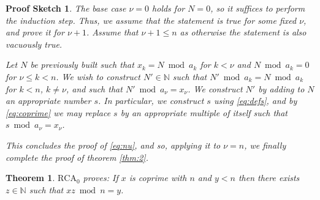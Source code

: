 \documentclass{article}
\newtheorem{theorem}{Theorem}
\theoremstyle{nonumberplain}
\newtheorem{sketch}{Proof Sketch}
\newcommand{\N}{\mathbb{N}}
\newcommand{\RCA}{\mathrm{RCA}}
\begin{document}
\begin{sketch}
The base case $\nu = 0$ holds for $N = 0$, so it suffices to perform the induction step. Thus, we assume that the statement is true for some fixed $\nu$, and prove it for $\nu+1$. Assume that $\nu+1 \leq n$ as otherwise the statement is also vacuously true.

Let $N$ be previously built such that $x_k = N \bmod a_k$ for $k < \nu$ and $N \bmod a_k = 0$ for $\nu \leq k < n$. We wish to construct $N' \in \N$ such that $N' \bmod a_k = N \bmod a_k$ for $k < n$, $k \neq \nu$, and such that $N' \bmod a_\nu = x_\nu$. We construct $N'$ by adding to $N$ an appropriate number $s$. In particular, we construct $s$ using \eqref{eq:defs}, and by \eqref{eq:coprime} we may replace $s$ by an appropriate multiple of itself such that $s \bmod a_\nu = x_\nu$.

This concludes the proof of \eqref{eq:nu}, and so, applying it to $\nu = n$, we finally complete the proof of theorem \ref{thm:2}.
\end{sketch}

\begin{theorem}\label{thm:3}
$\RCA_0$ proves: If $x$ is coprime with $n$ and $y < n$ then there exists $z \in \N$ such that $xz \bmod n = y$.
\end{theorem}
\end{document}

